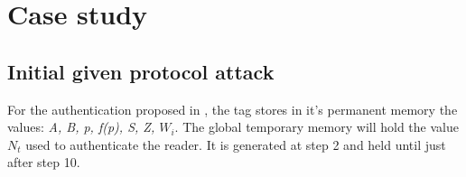 \chapter{Case study}

\section{Initial given protocol attack}

    For the authentication proposed in \cite{BOM}, the tag stores in it's permanent memory the values: \textit{A, B, p, f(p), S, Z, $W_i$}. The global temporary memory will hold the value $N_t$
    used to authenticate the reader. It is generated at step 2 and held until just after step 10.



